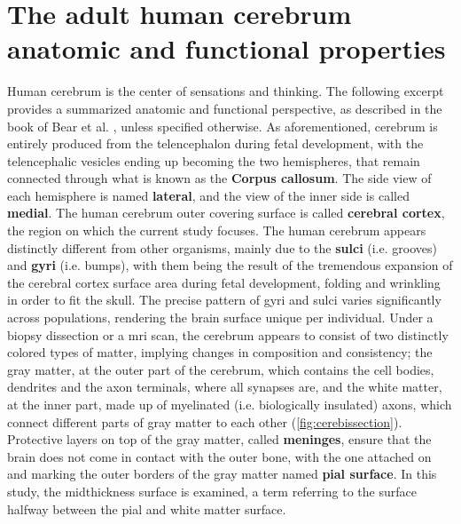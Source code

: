 \section{The adult human cerebrum anatomic and functional properties}
 Human cerebrum is the center of sensations and thinking. The following excerpt provides a summarized anatomic and functional perspective, as described in the book of Bear et al. \cite{Bear2016chapter7app}, unless specified otherwise.  As aforementioned, cerebrum is entirely produced  from the telencephalon during fetal development, with the telencephalic vesicles ending up becoming the two hemispheres, that remain connected through what is known as the \textbf{Corpus callosum}.  The side view of each hemisphere is named \textbf{lateral}, and the view of the inner side is called \textbf{medial}. The human cerebrum outer covering surface is called \textbf{cerebral cortex}, the region on which the current study focuses. The human cerebrum appears distinctly different from other organisms, mainly due to the \textbf{sulci} (i.e. grooves) and \textbf{gyri} (i.e. bumps), with them being the result of the tremendous expansion of the cerebral cortex surface area during fetal development, folding and wrinkling in order to fit the skull. The precise pattern of gyri and sulci varies significantly across populations, rendering the brain surface unique per individual. Under a biopsy dissection or a \ac{mri} scan, the cerebrum appears to consist of two distinctly colored types of matter, implying changes in composition and consistency; the gray matter, at the outer part of the cerebrum, which  contains the cell bodies, dendrites and the axon terminals, where all synapses are, and the white matter, at the inner part, made up of myelinated (i.e. biologically insulated) axons, which connect different parts of gray matter to each other (\autoref{fig:cerebissection}). Protective layers on top of the gray matter, called \textbf{meninges}, ensure that the brain does not come in contact with the outer bone, with the one attached on and marking the outer borders of the gray matter named \textbf{pial surface}. In this study, the midthickness surface is examined, a term referring to the surface halfway between the pial and white matter surface. 

